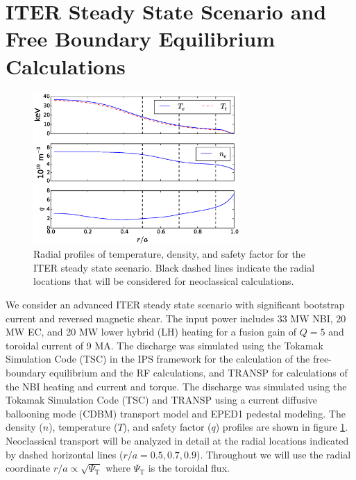 \documentclass[aip, pop, preprint]{revtex4-1}
\numberwithin{figure}{section}
\numberwithin{equation}{section}
\begin{document}
\section{ITER Steady State Scenario and Free Boundary Equilibrium Calculations} \label{vmec}

\FloatBarrier

\begin{figure}[h!]
\centering
\includegraphics[width=0.7\textwidth]{figure1.eps}
\caption{\label{fig:profiles} Radial profiles of temperature, density, and safety factor for the ITER steady state scenario.\cite{Poli2014} Black dashed lines indicate the radial locations that will be considered for neoclassical calculations.}
\end{figure}

We consider an advanced ITER steady state scenario with significant bootstrap current and reversed magnetic shear.\cite{Poli2014} The input power includes 33 MW NBI, 20 MW EC, and 20 MW lower hybrid (LH) heating for a fusion gain of $Q = 5$ and toroidal current of 9 MA. The discharge was simulated using the Tokamak Simulation Code (TSC) in the IPS \cite{Elwasif2010} framework for the calculation of the free-boundary equilibrium and the RF calculations, and TRANSP for calculations of the NBI heating and current and torque. The discharge was simulated using the Tokamak Simulation Code (TSC) \cite{Jardin1986} and TRANSP \cite{Hawryluk1980} using a current diffusive ballooning mode (CDBM) \cite{Fukuyama1995,Fukuyama1998} transport model and EPED1 \cite{Snyder2011} pedestal modeling. The density ($n$), temperature ($T$), and safety factor ($q$) profiles are shown in figure \ref{fig:profiles}. Neoclassical transport will be analyzed in detail at the radial locations indicated by dashed horizontal lines ($r/a = 0.5, 0.7, 0.9$). Throughout we will use the radial coordinate $r/a \propto \sqrt{\Psi_{\mathrm{T}}}$ where $\Psi_{\mathrm{T}}$ is the toroidal flux.
\end{document}
